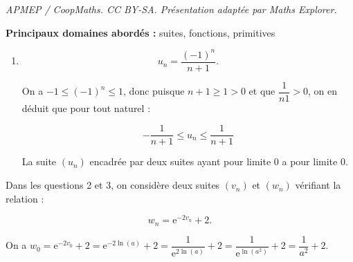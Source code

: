 \documentclass[10pt]{article}
\providecommand{\decosix}{}
\providecommand{\e}{{\mathrm{e}}}
\begin{document}
\noindent\textit{APMEP / CoopMaths. CC BY-SA. Présentation adaptée par Maths Explorer.}\par\medskip
\textbf{Principaux domaines abordés :} suites, fonctions, primitives

\medskip









\begin{enumerate}
\item 

\[u_n = \dfrac{(- 1)^n}{n + 1}.\]








On a $- 1 \leqslant (- 1)^n \leqslant 1$, donc puisque $n+1 \geqslant 1 > 0$ et que $\dfrac{1}{n  1} > 0$, on en déduit que pour tout naturel :

\[- \dfrac{1}{n+1} \leqslant u_n \leqslant \dfrac{1}{n+1}\]

La suite $\left(u_n\right)$ encadrée par deux suites ayant pour limite 0 a pour limite 0.
\begin{center} \decosix \decosix \decosix  \end{center}
\end{enumerate}

Dans les questions 2 et 3, on considère deux suites $\left(v_n\right)$  et $\left(w_n\right)$ vérifiant la relation : 

\[w_n = \e^{- 2v_n} + 2.\]










On a $w_0 = \e^{- 2v_0} + 2 = \e^{- 2\ln (a)} + 2 = \dfrac{1}{\e^{2\ln(a)}} + 2=  \dfrac{1}{\e^{\ln \left(a^2\right)}} + 2 = \dfrac{1}{a^2} + 2$.
\end{document}
